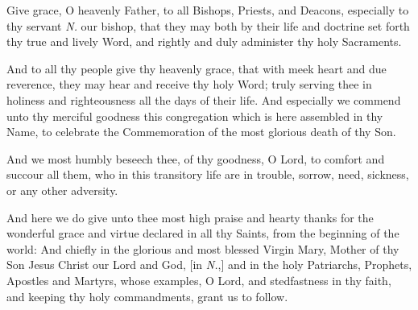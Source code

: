 Give grace, O heavenly Father, to all Bishops, Priests, and Deacons, 
especially to thy servant \emph{N.} our bishop, %
that they may both by their life and doctrine set forth thy true and lively Word, and rightly and duly administer thy holy Sacraments.

And to all thy people give thy heavenly grace,
that with meek heart and due reverence, they may hear and receive thy holy Word; truly serving thee in holiness and righteousness all the days of their life.
And especially we commend unto thy merciful goodness this congregation which is here assembled in thy Name, to celebrate the Commemoration of the most glorious death of thy Son.

And we most humbly beseech thee, of thy goodness, O Lord, to comfort and succour all them, who in this transitory life are in trouble, sorrow, need, sickness, or any other adversity.






And here we do give unto thee most high praise and hearty thanks for the wonderful grace and virtue declared in all thy Saints, from the beginning of the world: And chiefly in the glorious and most blessed Virgin Mary, Mother of thy Son Jesus Christ our Lord and God, [in \emph{N.},] and in the holy Patriarchs, Prophets, Apostles and Martyrs, whose examples, O Lord, and stedfastness in thy faith, and keeping thy holy commandments, grant us to follow.

